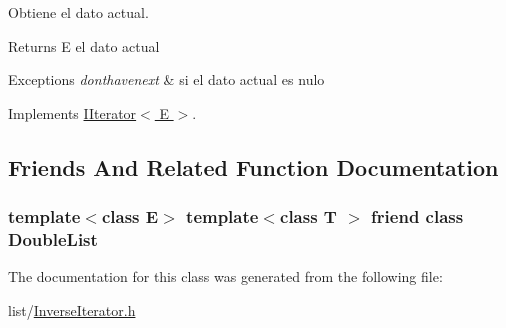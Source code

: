 Obtiene el dato actual. 

\begin{DoxyReturn}{Returns}
E el dato actual 
\end{DoxyReturn}

\begin{DoxyExceptions}{Exceptions}
{\em donthavenext} & si el dato actual es nulo \\
\hline
\end{DoxyExceptions}


Implements \hyperlink{class_i_iterator_a8a73f0fb41a66fe98e5e636378759196}{I\-Iterator$<$ E $>$}.



\subsection{Friends And Related Function Documentation}
\hypertarget{class_inverse_iterator_ad435a9844a002995926acf522128f7a8}{
\subsubsection[{Double\-List}]{\setlength{\rightskip}{0pt plus 5cm}template$<$class E$>$ template$<$class T $>$ friend class {\bf Double\-List}\hspace{0.3cm}{\ttfamily [friend]}}}\label{class_inverse_iterator_ad435a9844a002995926acf522128f7a8}


The documentation for this class was generated from the following file\-:\begin{DoxyCompactItemize}
\item 
list/\hyperlink{_inverse_iterator_8h}{Inverse\-Iterator.\-h}\end{DoxyCompactItemize}
